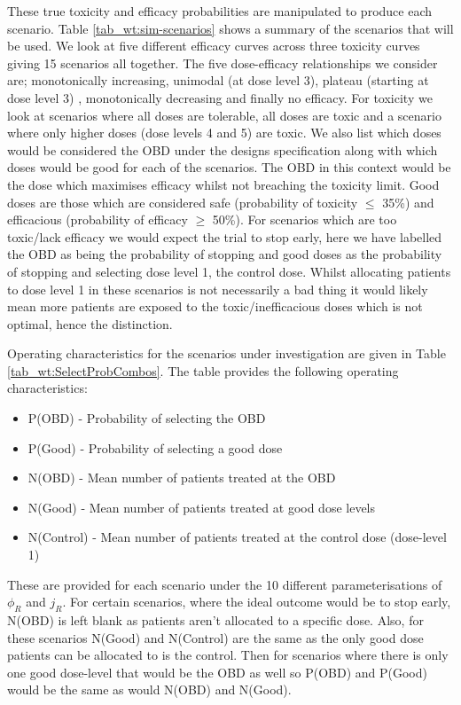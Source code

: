 These true toxicity and efficacy probabilities are manipulated to produce each scenario. Table \ref{tab_wt:sim-scenarios} shows a summary of the scenarios that will be used. We look at five different efficacy curves across three toxicity curves giving 15 scenarios all together. The five dose-efficacy relationships we consider are; monotonically increasing, unimodal (at dose level 3), plateau (starting at dose level 3) , monotonically decreasing and finally no efficacy. For toxicity we look at scenarios where all doses are tolerable, all doses are toxic and a scenario where only higher doses (dose levels 4 and 5) are toxic. We also list which doses would be considered the OBD under the designs specification along with which doses would be good for each of the scenarios. The OBD in this context would be the dose which maximises efficacy whilst not breaching the toxicity limit. Good doses are those which are considered safe (probability of toxicity $\leq$ 35\%) and efficacious (probability of efficacy $\geq$ 50\%). For scenarios which are too toxic/lack efficacy we would expect the trial to stop early, here we have labelled the OBD as being the probability of stopping and good doses as the probability of stopping and selecting dose level 1, the control dose. Whilst allocating patients to dose level 1 in these scenarios is not necessarily a bad thing it would likely mean more patients are exposed to the toxic/inefficacious doses which is not optimal, hence the distinction.  

Operating characteristics for the scenarios under investigation are given in Table \ref{tab_wt:SelectProbCombos}. The table provides the following operating characteristics: 

\begin{itemize}
	\item P(OBD) - Probability of selecting the OBD
	\item P(Good) - Probability of selecting a good dose
	\item N(OBD) - Mean number of patients treated at the OBD
	\item N(Good) - Mean number of patients treated at good dose levels
	\item N(Control) - Mean number of patients treated at the control dose (dose-level 1)
\end{itemize}

These are provided for each scenario under the 10 different parameterisations of $\phi_R$ and $j_R$. For certain scenarios, where the ideal outcome would be to stop early, N(OBD) is left blank as patients aren't allocated to a specific dose. Also, for these scenarios N(Good) and N(Control) are the same as the only good dose patients can be allocated to is the control. Then for scenarios where there is only one good dose-level that would be the OBD as well so P(OBD) and P(Good) would be the same as would N(OBD) and N(Good). 


